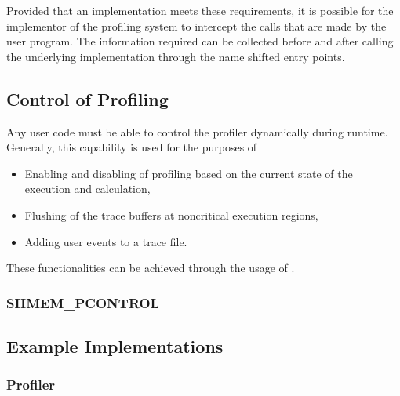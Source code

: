 Provided that an \openshmem implementation meets these requirements, 
it is possible for the implementor of the profiling system 
to intercept the \openshmem calls that are made by the user 
program. The information required can be collected before and after 
calling the underlying \openshmem implementation through the name 
shifted entry points. 

\subsection{Control of Profiling}
\label{sec:pshmem_control_profile}
Any user code must be able to control the profiler dynamically 
during runtime. Generally, this capability is used for the 
purposes of

\begin{itemize}
\item Enabling and disabling of profiling based on the current 
state of the execution and calculation,
\item Flushing of the trace buffers at noncritical execution
regions,
\item Adding user events to a trace file.
\end{itemize}

These functionalities can be achieved through the usage of 
.

\subsubsection{\textbf{SHMEM\_PCONTROL}}\label{subsec:shmem_pcontrol}




\subsection{Example Implementations}
\label{sec:pshmem_example_implementations}

\subsubsection{Profiler}
\label{sec:pshmem_example_profiler}


